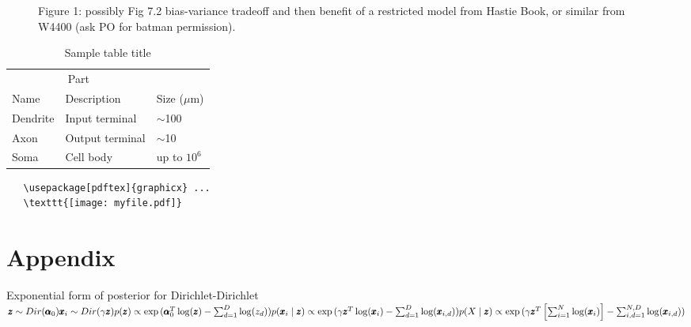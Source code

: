 \documentclass{article}
\begin{document}
\begin{figure}
  \centering
  \fbox{\rule[-.5cm]{0cm}{4cm} \rule[-.5cm]{4cm}{0cm}}
  \caption{Figure 1: possibly Fig 7.2 bias-variance tradeoff and then benefit of a restricted model from Hastie Book, or similar from W4400 (ask PO for batman permission).}
\end{figure}



\begin{table}
  \caption{Sample table title}
  \label{sample-table}
  \centering
  \begin{tabular}{lll}
    \toprule
    \multicolumn{2}{c}{Part}                   \\
    \cmidrule(r){1-2}
    Name     & Description     & Size ($\mu$m) \\
    \midrule
    Dendrite & Input terminal  & $\sim$100     \\
    Axon     & Output terminal & $\sim$10      \\
    Soma     & Cell body       & up to $10^6$  \\
    \bottomrule
  \end{tabular}
\end{table}


\begin{verbatim}
   \usepackage[pdftex]{graphicx} ...
   \texttt{[image: myfile.pdf]}
\end{verbatim}




\clearpage

\section{Appendix}
Exponential form of posterior for Dirichlet-Dirichlet \\
\begin{math}
\pmb{z} \sim Dir( \pmb{\alpha}_0) \\
\pmb{x}_i \sim Dir( \gamma \pmb{z}) \\
p(\pmb{z}) \propto \exp{(\pmb{\alpha}_0^T \log(\pmb{z}) - \sum_{d=1}^D \log(z_d))} \\
p(\pmb{x}_i \mid \pmb{z}) \propto \exp{(\gamma \pmb{z}^T \log(\pmb{x}_i) - \sum_{d=1}^D \log(\pmb{x}_{i,d}))} \\
p(X \mid \pmb{z}) \propto \exp{(\gamma \pmb{z}^T \left[\sum_{i=1}^N \log(\pmb{x}_i) \right] - \sum_{i,d=1}^{N,D} \log(\pmb{x}_{i,d}))} \\ 
\end{math}
\end{document}
